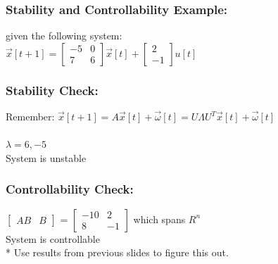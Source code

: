 \documentclass{beamer}
\begin{document}

\begin{frame}
\frametitle{Stability and Controllability Example:}

given the following system: \\
$\vec{x}[t+1] = 
\begin{bmatrix}
-5 & 0 \\
7 & 6
\end{bmatrix}
\vec{x}[t] + 
\begin{bmatrix}
2 \\
-1
\end{bmatrix}
u[t]$\\
\end{frame}

\begin{frame}
\frametitle{Stability Check:}
Remember: $\vec{x}[t+1] = A\vec{x}[t] + \vec{\omega}[t]= U \Lambda U^T \vec{x}[t] + \vec{\omega}[t]$ \\ \\
$\lambda = 6, -5$\\ \pause
System is unstable
\end{frame}

\begin{frame}
\frametitle{Controllability Check:}

$\begin{bmatrix}
AB & B
\end{bmatrix}$ = 
$\begin{bmatrix}
-10 & 2 \\
8 & -1
\end{bmatrix}$
which spans $R^{n}$ \\ \pause
System is controllable\\
* Use results from previous slides to figure this out.

\end{frame}
\end{document}
